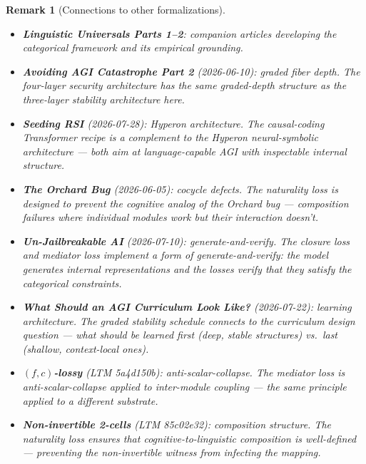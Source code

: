 \documentclass[11pt,a4paper]{article}
\newtheorem{remark}[definition]{Remark}
\begin{document}
\begin{remark}[Connections to other formalizations]
\begin{itemize}
\item \textbf{Linguistic Universals Parts 1--2}: companion articles
  developing the categorical framework and its empirical grounding.
\item \textbf{Avoiding AGI Catastrophe Part 2} (2026-06-10): graded
  fiber depth. The four-layer security architecture has the same
  graded-depth structure as the three-layer stability architecture
  here.
\item \textbf{Seeding RSI} (2026-07-28): Hyperon architecture. The
  causal-coding Transformer recipe is a complement to the Hyperon
  neural-symbolic architecture --- both aim at language-capable AGI
  with inspectable internal structure.
\item \textbf{The Orchard Bug} (2026-06-05): cocycle defects. The
  naturality loss is designed to prevent the cognitive analog of
  the Orchard bug --- composition failures where individual modules
  work but their interaction doesn't.
\item \textbf{Un-Jailbreakable AI} (2026-07-10): generate-and-verify.
  The closure loss and mediator loss implement a form of
  generate-and-verify: the model generates internal representations
  and the losses verify that they satisfy the categorical constraints.
\item \textbf{What Should an AGI Curriculum Look Like?} (2026-07-22):
  learning architecture. The graded stability schedule connects to
  the curriculum design question --- what should be learned first
  (deep, stable structures) vs.\ last (shallow, context-local ones).
\item \textbf{$(f,c)$-lossy} (LTM 5a4d150b): anti-scalar-collapse.
  The mediator loss is anti-scalar-collapse applied to inter-module
  coupling --- the same principle applied to a different substrate.
\item \textbf{Non-invertible 2-cells} (LTM 85c02e32): composition
  structure. The naturality loss ensures that cognitive-to-linguistic
  composition is well-defined --- preventing the non-invertible
  witness from infecting the mapping.
\end{itemize}
\end{remark}
\end{document}
